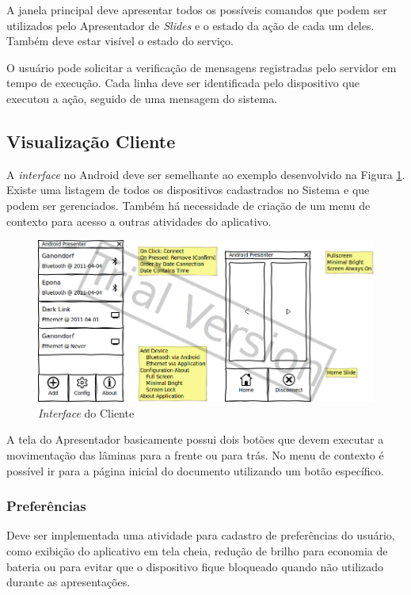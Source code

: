 \documentclass{article}
\begin{document}
A janela principal deve apresentar todos os possíveis comandos que podem ser
utilizados pelo Apresentador de \emph{Slides} e o estado da ação de cada um
deles. Também deve estar visível o estado do serviço.

O usuário pode solicitar a verificação de mensagens registradas pelo servidor
em tempo de execução. Cada linha deve ser identificada pelo dispositivo que
executou a ação, seguido de uma mensagem do sistema.

\subsection{Visualização Cliente}

A \emph{interface} no Android deve ser semelhante ao exemplo desenvolvido na
Figura \ref{fig:client-view}. Existe uma listagem de todos os dispositivos
cadastrados no Sistema e que podem ser gerenciados. Também há necessidade de
criação de um menu de contexto para acesso a outras atividades do aplicativo.

\begin{figure}
    \centering{}
    \includegraphics[width=\textwidth]{presenter-client-view.png}
    \caption{\emph{Interface} do Cliente}
    \label{fig:client-view}
\end{figure}

A tela do Apresentador basicamente possui dois botões que devem executar a
movimentação das lâminas para a frente ou para trás. No menu de contexto é
possível ir para a página inicial do documento utilizando um botão específico.

\subsubsection{Preferências}

Deve ser implementada uma atividade para cadastro de preferências do usuário,
como exibição do aplicativo em tela cheia, redução de brilho para economia de
bateria ou para evitar que o dispositivo fique bloqueado quando não utilizado
durante as apresentações.
\end{document}
